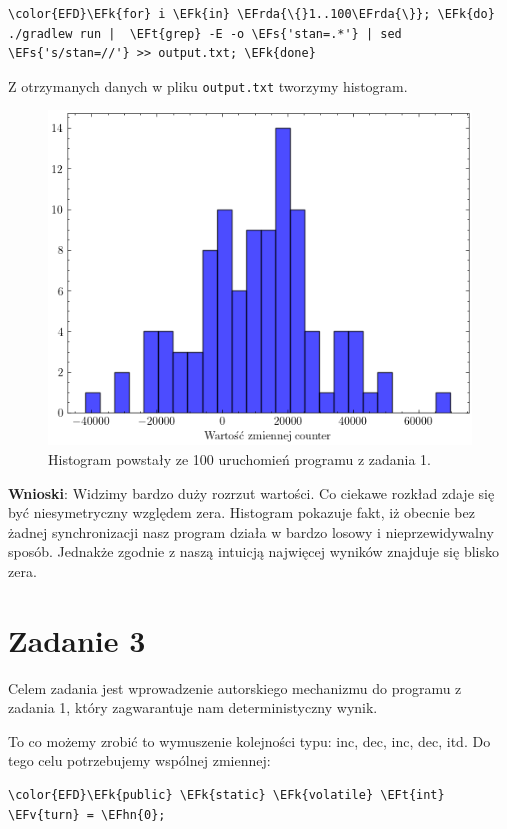 \documentclass[11pt]{article}
\newcommand{\EFs}[1]{\textcolor{EFs}{#1}} %
\newcommand{\EFk}[1]{\textbf{#1}} %
\newcommand{\EFv}[1]{#1} %
\newcommand{\EFt}[1]{\textbf{#1}} %
\newcommand{\EFhn}[1]{\textcolor{EFhn}{\textbf{#1}}} %
\newcommand{\EFrda}[1]{\textcolor{EFrda}{#1}} %
\begin{document}
\begin{Code}
\begin{Verbatim}
\color{EFD}\EFk{for} i \EFk{in} \EFrda{\{}1..100\EFrda{\}}; \EFk{do} ./gradlew run |  \EFt{grep} -E -o \EFs{'stan=.*'} | sed \EFs{'s/stan=//'} >> output.txt; \EFk{done}
\end{Verbatim}
\end{Code}

Z otrzymanych danych w pliku \texttt{output.txt} tworzymy histogram.

\begin{figure}[H]
\centering
\includegraphics[width=.9\linewidth]{histogram.png}
\caption{\label{}Histogram powstały ze 100 uruchomień programu z zadania 1.}
\end{figure}

\textbf{Wnioski}: Widzimy bardzo duży rozrzut wartości. Co ciekawe rozkład zdaje się być niesymetryczny względem zera.
Histogram pokazuje fakt, iż obecnie bez żadnej synchronizacji nasz program działa w bardzo losowy i
nieprzewidywalny sposób. Jednakże zgodnie z naszą intuicją najwięcej wyników znajduje się blisko zera.
\section*{Zadanie 3}
\label{sec:orgc4a985a}
Celem zadania jest wprowadzenie autorskiego mechanizmu do programu z zadania 1, który
zagwarantuje nam deterministyczny wynik.

To co możemy zrobić to wymuszenie kolejności typu: inc, dec, inc, dec, itd.
Do tego celu potrzebujemy wspólnej zmiennej:

\begin{Code}
\begin{Verbatim}
\color{EFD}\EFk{public} \EFk{static} \EFk{volatile} \EFt{int} \EFv{turn} = \EFhn{0};
\end{Verbatim}
\end{Code}
\end{document}
